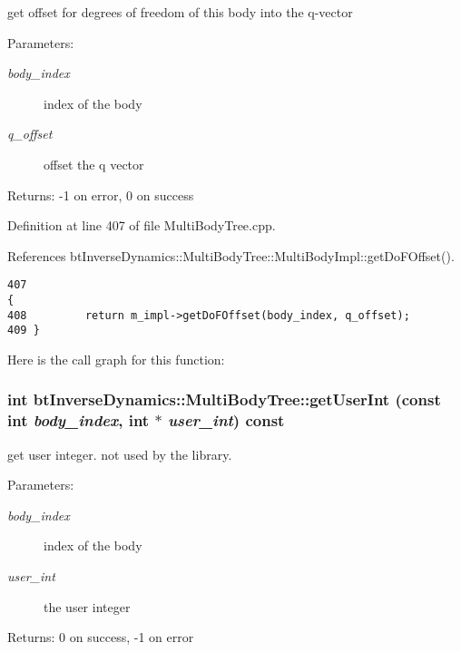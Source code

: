 get offset for degrees of freedom of this body into the q-vector \begin{Desc}
\item[Parameters:]
\begin{description}
\item[{\em body\_\-index}]index of the body \item[{\em q\_\-offset}]offset the q vector \end{description}
\end{Desc}
\begin{Desc}
\item[Returns:]-1 on error, 0 on success \end{Desc}


Definition at line 407 of file MultiBodyTree.cpp.

References btInverseDynamics::MultiBodyTree::MultiBodyImpl::getDoFOffset().

\begin{Code}\begin{verbatim}407                                                                          {
408         return m_impl->getDoFOffset(body_index, q_offset);
409 }
\end{verbatim}
\end{Code}




Here is the call graph for this function:\hypertarget{classbt_inverse_dynamics_1_1_multi_body_tree_65a04485f338b3c3c1ace010d460a453}{
\subsubsection[getUserInt]{\setlength{\rightskip}{0pt plus 5cm}int btInverseDynamics::MultiBodyTree::getUserInt (const int {\em body\_\-index}, \/  int $\ast$ {\em user\_\-int}) const}}
\label{classbt_inverse_dynamics_1_1_multi_body_tree_65a04485f338b3c3c1ace010d460a453}


get user integer. not used by the library. \begin{Desc}
\item[Parameters:]
\begin{description}
\item[{\em body\_\-index}]index of the body \item[{\em user\_\-int}]the user integer \end{description}
\end{Desc}
\begin{Desc}
\item[Returns:]0 on success, -1 on error \end{Desc}


